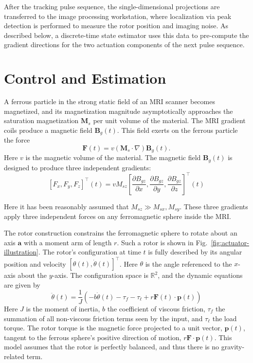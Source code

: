 \documentclass[journal]{IEEEtran}
\newcommand{\R}{\mathbb{R}}
\begin{document}
After the tracking pulse sequence, the single-dimensional projections are transferred to the image processing workstation, where localization via peak detection is performed to measure the rotor position and imaging noise. As described below, a discrete-time state estimator uses this data to pre-compute the gradient directions for the two actuation components of the next pulse sequence. 


\section{Control and Estimation}
\label{sec:controlLaw}

A ferrous particle in the strong static field of an MRI scanner becomes magnetized, and its magnetization magnitude asymptotically approaches the saturation magnetization $\mathbf{M}_s$ per unit volume of the material.  The MRI gradient coils  produce a magnetic field  $\mathbf{B}_g(t)$. This field exerts 
 on the ferrous particle the force 
\begin{equation}
\mathbf{F}(t) = v\left( \mathbf{M}_s
\cdot \nabla \right) \mathbf{B}_g(t). \label{eq:forceOnDipole}
\end{equation}
Here $v$ is the magnetic volume of the material.  The magnetic field $\mathbf{B}_g(t)$ is designed to produce three independent gradients:
\begin{equation}
\left[ F_x,F_y, F_z \right]^\intercal\!\!(t)= v M_{sz}\left[  \frac{ \partial B_{gz}}{\partial x},  \frac{ \partial B_{gz}}{\partial y}, \frac{ \partial B_{gz}}{\partial z} \right]^\intercal\!\!\!\!(t)
\label{eq:applicableForces}
\end{equation}

Here it has been reasonably assumed that $M_{sz} \gg M_{sx}, M_{sy}$.
These three gradients apply three independent forces on any ferromagnetic sphere inside the MRI.  

The rotor construction constrains the ferromagnetic sphere to rotate about an axis $\mathbf{a}$ with a moment arm of length  $r$. Such a rotor is shown in Fig.~\ref{fig:actuator-illustration}.  The rotor's configuration at time $t$ is fully described by its angular position and velocity $[\theta(t), \dot{\theta}(t)]^\intercal$. Here $\theta$ is the angle referenced to the $x$-axis about the $y$-axis. The configuration space is $\R^{2}$,  and the dynamic equations are given by
\begin{equation}
\ddot{\theta}(t) = \frac{1}{J}\left(-b\dot{\theta}(t) -\tau_{f}-\tau_{\ell} + r \mathbf{F}(t)\cdot \mathbf{p}(t) \right)
\label{eq:rotorDynamics}
\end{equation}
Here $J$ is the moment of inertia, $b$ the coefficient of viscous friction,  $\tau_{f}$ the summation of all non-viscous friction terms seen by the input,  and $\tau_{\ell}$ the load torque. The rotor torque is the magnetic force projected  to a unit vector, $\mathbf{p}(t)$, tangent to the ferrous sphere's positive direction of motion, $r \mathbf{F}\cdot \mathbf{p}(t)$.  This model assumes that the rotor is perfectly balanced, and thus there is no gravity-related term. 
\end{document}
